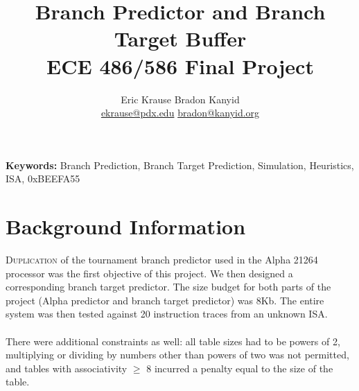 \documentclass[twocolumn]{article}
\title{\textbf{Branch Predictor and Branch Target Buffer} \\
ECE 486/586 Final Project }
\author{Eric Krause \hspace{1.4in} Bradon Kanyid\\
\url{ekrause@pdx.edu} \hspace{1in} \url{bradon@kanyid.org}}
\begin{document}
\twocolumn[
  \begin{@twocolumnfalse}
    \maketitle
    \begin{abstract}
      ...
    \end{abstract}
  \end{@twocolumnfalse}
]
\textbf{Keywords:} Branch Prediction, Branch Target Prediction, Simulation, Heuristics, ISA, 0xBEEFA55

\section{Background Information}
\lettrine{D}{uplication} of the tournament branch predictor used in the Alpha 21264 processor was the first objective of this project.  We then designed a corresponding branch target predictor.  The size budget for both parts of the project (Alpha predictor and branch target predictor) was 8Kb.  The entire system was then tested against 20 instruction traces from an unknown ISA. \\\\
There were additional constraints as well: all table sizes had to be powers of 2, multiplying or dividing by numbers other than powers of two was not permitted, and tables with associativity $\ge$ 8 incurred a penalty equal to the size of the table.\\\\
\end{document}
